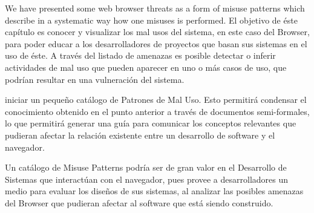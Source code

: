 \documentclass{sig-alternate-05-2015}
\begin{document}




We have presented some web browser threats as a form of misuse patterns which describe in a systematic way how one misuses is performed.
El objetivo de éste capítulo es conocer y visualizar los mal usos del sistema, en este caso del Browser, para poder educar a los desarrolladores de proyectos que basan sus sistemas en el uso de éste. A través del listado de amenazas es posible detectar o inferir actividades de mal uso que pueden aparecer en uno o más casos de uso, que podrían resultar en una vulneración del sistema.

iniciar un pequeño catálogo de Patrones de Mal Uso. Esto permitirá condensar el conocimiento obtenido en el punto anterior a través de documentos semi-formales, lo que permitirá generar una guía para comunicar los conceptos relevantes que pudieran afectar la relación existente entre un desarrollo de software y el navegador.

Un catálogo de Misuse Patterns podría ser de gran valor en el Desarrollo de Sistemas que interactúan con el navegador, pues provee a desarrolladores un medio para evaluar los diseños de sus sistemas, al analizar las posibles amenazas del Browser que pudieran afectar al software que está siendo construido.
\end{document}

